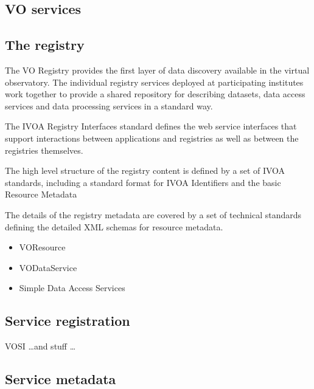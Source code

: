 \documentclass{article}
\begin{document}
{\subsection{VO services}


\subsection{The registry}

The VO Registry provides the first layer of data discovery available in the
virtual observatory. The individual registry services deployed at participating
institutes work together to provide a shared repository for describing datasets,
data access services and data processing services in a standard way.

The IVOA Registry Interfaces standard
defines the web service interfaces that support interactions between
applications and registries as well as between the registries themselves.

The high level structure of the registry content is defined by a
set of IVOA standards, including a standard format for IVOA Identifiers
and the basic Resource Metadata

The details of the registry metadata are covered by a set of technical
standards defining the detailed XML schemas for resource metadata.
\begin{itemize}
  \item VOResource
  \item VODataService
  \item Simple Data Access Services
\end{itemize}




\subsection{Service registration}

VOSI \ldots and stuff \ldots

\subsection{Service metadata}

}
\end{document}
